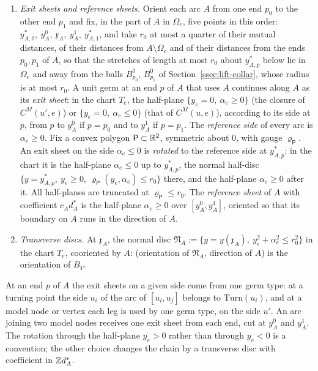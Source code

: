 \begin{enumerate}
\item[(M4)] \emph{Exit sheets and reference sheets.} Orient each arc $A$ from one end $p_0$ to the other end $p_1$ and fix,
in the part of $A$ in $\Omega_e$, five points in this order:
$y^*_{A,0},\ y^0_A,\ \mathfrak x_A,\ y^1_A,\ y^*_{A,1}$, and take $r_0$ at most a quarter of their mutual distances, of
their distances from $A\setminus\Omega_e$ and of their distances from the ends $p_0,p_1$ of $A$, so that the stretches of
length at most $r_0$ about $y^*_{A,p}$ below lie in $\Omega_e$ and away from the balls $B^0_{p_0}$, $B^0_{p_1}$ of
Section~\ref{ssec:lift-collar}, whose radius is at most $r_0$. A unit germ at an end $p$ of $A$ that uses $A$ continues along $A$
as its \emph{exit sheet}: in the chart $T_e$, the half-plane $\{y_e=0,\ \alpha_e\ge0\}$ (the closure of $C^M(u',e)$) or
$\{y_e=0,\ \alpha_e\le0\}$ (that of $C^M(u,e)$), according to its side at $p$, from $p$ to $y^0_A$ if $p=p_0$ and to
$y^1_A$ if $p=p_1$. The \emph{reference side} of every arc is $\alpha_e\ge0$. Fix a convex polygon $\mathsf P\subset\mathbb R^2$,
symmetric about $0$, with gauge $\varrho_{\mathsf P}$. An exit sheet on the side $\alpha_e\le0$ is \emph{rotated} to the
reference side at $y^*_{A,p}$: in the chart it is the half-plane $\alpha_e\le0$ up to $y^*_{A,p}$, the normal half-disc
$\{y=y^*_{A,p},\ y_e\ge0,\ \varrho_{\mathsf P}(y_e,\alpha_e)\le r_0\}$ there, and the half-plane $\alpha_e\ge0$ after it.
All half-planes are truncated at $\varrho_{\mathsf P}\le r_0$. The \emph{reference sheet} of $A$ with coefficient
$c_Ad^*_A$ is the half-plane $\alpha_e\ge0$ over $[y^0_A,y^1_A]$, oriented so that its boundary on $A$ runs in the direction
of $A$.
\item[(M5)] \emph{Transverse discs.} At $\mathfrak x_A$, the normal disc $\mathfrak N_A:=\{y=y(\mathfrak x_A),\
y_e^2+\alpha_e^2\le r_0^2\}$ in the chart $T_e$, cooriented by $A$: (orientation of $\mathfrak N_A$, direction of $A$) is
the orientation of $B_Y$.
\end{enumerate}

At an end $p$ of $A$ the exit sheets on a given side come from one germ type: at a turning point the side $u_i$ of the
arc of $[u_i,u_j]$ belongs to $\mathrm{Turn}(u_i)$, and at a model node or vertex each leg is used by one germ type, on
the side $u'$. An arc joining two model nodes receives one exit sheet from each end, cut at $y^0_A$ and $y^1_A$. The rotation through the half-plane $y_e>0$ rather than through $y_e<0$ is a convention; the other choice changes
the chain by a transverse disc with coefficient in $\mathbb Z d^*_A$.

